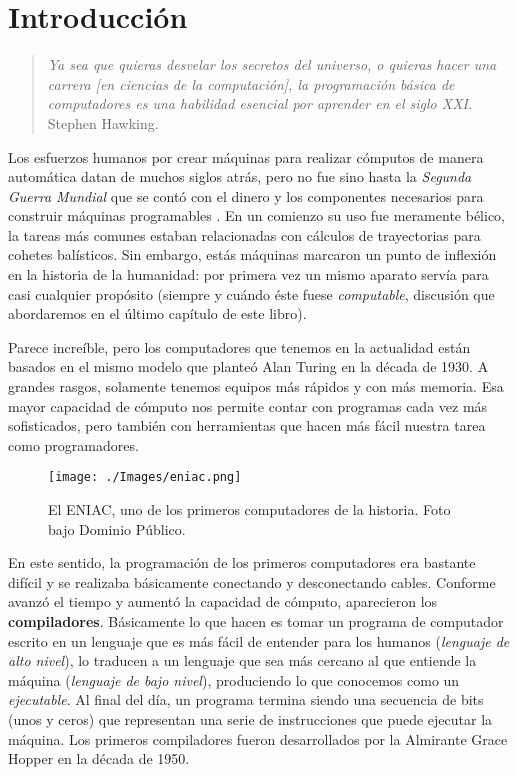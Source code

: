 \chapter{Introducción}

\begin{quote}
\emph{Ya sea que quieras desvelar los secretos del universo, o quieras hacer una carrera [en ciencias de la computación], la programación básica de computadores es una habilidad esencial por aprender en el siglo XXI.} \\
Stephen Hawking.
\end{quote}

Los esfuerzos humanos por crear máquinas para realizar cómputos de manera automática datan de muchos siglos atrás, pero no fue sino hasta la \emph{Segunda Guerra Mundial} que se contó con el dinero y los componentes necesarios para construir máquinas programables \cite[p.~108]{evansIntro}. En un comienzo su uso fue meramente bélico, la tareas más comunes estaban relacionadas con cálculos de trayectorias para cohetes balísticos. Sin embargo, estás máquinas marcaron un punto de inflexión en la historia de la humanidad: por primera vez un mismo aparato servía para casi cualquier propósito (siempre y cuándo éste fuese \emph{computable}, discusión que abordaremos en el último capítulo de este libro).

Parece increíble, pero los computadores que tenemos en la actualidad están basados en el mismo modelo que planteó Alan Turing en la década de 1930. A grandes rasgos, solamente tenemos equipos más rápidos y con más memoria. Esa mayor capacidad de cómputo nos permite contar con programas cada vez más sofisticados, pero también con herramientas que hacen más fácil nuestra tarea como programadores.
 \newpage

\begin{wrapfigure}{r}{0.5\textwidth}
	\begin{center}
	\texttt{[image: ./Images/eniac.png]}
	\end{center}	
	\caption{El ENIAC, uno de los primeros computadores de la historia. Foto bajo  Dominio Público.}
\end{wrapfigure}

En este sentido, la programación de los primeros computadores era bastante difícil y se realizaba básicamente conectando y desconectando cables. Conforme avanzó el tiempo y aumentó la capacidad de cómputo, aparecieron los \textbf{compiladores}. Básicamente lo que hacen es tomar un programa de computador escrito en un lenguaje que es más fácil de entender para los humanos (\emph{lenguaje de alto nivel}), lo traducen a un lenguaje que sea más cercano al que entiende la máquina (\emph{lenguaje de bajo nivel}), produciendo lo que conocemos como un \emph{ejecutable}. Al final del día, un programa termina siendo una secuencia de bits (unos y ceros) que representan una serie de instrucciones que puede ejecutar la máquina. Los primeros compiladores fueron desarrollados por la Almirante Grace Hopper en la década de 1950.

